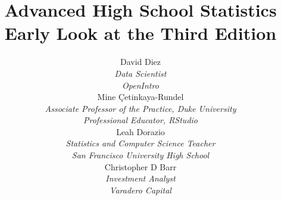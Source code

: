 
\title{\huge Advanced High School Statistics\vspace{1.5mm} \\ \Large Early Look at the Third Edition} %
\author{David Diez \\
\small\emph{Data Scientist}\\
\small\emph{OpenIntro} \\[6mm]
Mine \c{C}etinkaya-Rundel \\
\small\emph{Associate Professor of the Practice,
    Duke University} \\
\small\emph{Professional Educator, RStudio} \\[6mm]
Leah Dorazio \\
\small\emph{Statistics and Computer Science Teacher}\\
\small\emph{San Francisco University High School} \\[6mm]
Christopher D Barr \\
\small\emph{Investment Analyst} \\
\small\emph{Varadero Capital} \\
}
